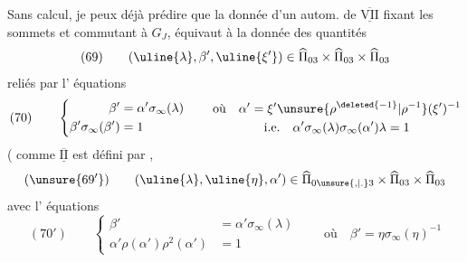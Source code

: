 Sans calcul, je peux déjà prédire que la donnée d'un autom. de $\overline{\underline{\mathrm{VII}}}$ fixant les sommets et commutant à $G_J$, équivaut à la donnée des quantités
\[
(69)\qquad (\uline{\lambda},\beta',\uline{\xi'})\in\widehat\Pi_{03}\times\widehat\Pi_{03}\times\widehat\Pi_{03}
\]
reliés par l' équations 
\[
(70)\qquad\left\{\begin{aligned}
\beta'&=\alpha'\sigma_\infty(\lambda)\\
\beta'\sigma_\infty(\beta')&=1
\end{aligned}\right.\qquad
\begin{gathered}
\text{où}\quad\alpha'=\xi'\unsure{\rho^{\deleted{-1}}|\rho^{-1}}(\xi')^{-1}\\
\text{i.e.}\quad\alpha'\sigma_\infty(\lambda)\sigma_\infty(\alpha')\lambda=1
\end{gathered}
\]
( comme  $\overline{\underline{\mathrm{II}}}$  est défini par ,
\[
(\unsure{69'})\qquad(\uline{\lambda},\uline{\eta},\alpha')\in\widehat\Pi_{0\unsure{,|.}3}\times\widehat\Pi_{03}\times\widehat\Pi_{03}
\]
avec l' équations
\[
(70')\qquad\left\{\begin{aligned}
\beta'&=\alpha'\sigma_\infty(\lambda)\\
\alpha'\rho(\alpha')\rho^2(\alpha')&=1
\end{aligned}\right.\qquad\text{où}\quad\beta'=\eta\sigma_\infty(\eta)^{-1}
\]


